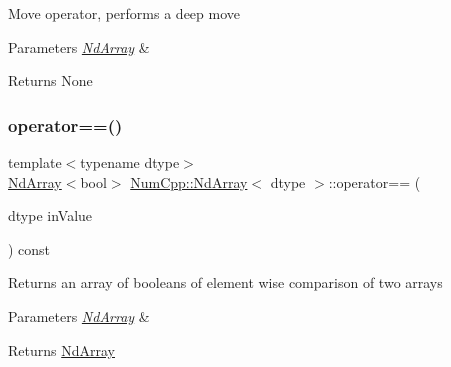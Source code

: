 Move operator, performs a deep move


\begin{DoxyParams}{Parameters}
{\em \mbox{\hyperlink{class_num_cpp_1_1_nd_array}{Nd\+Array}}} & \\
\hline
\end{DoxyParams}
\begin{DoxyReturn}{Returns}
None 
\end{DoxyReturn}
\mbox{\label{class_num_cpp_1_1_nd_array_ac14230e3c4a47152025ff97e9d78cc78}} 
\subsubsection{\texorpdfstring{operator==()}{operator==()}\hspace{0.1cm}{\footnotesize\ttfamily [1/2]}}
{\footnotesize\ttfamily template$<$typename dtype$>$ \\
\mbox{\hyperlink{class_num_cpp_1_1_nd_array}{Nd\+Array}}$<$bool$>$ \mbox{\hyperlink{class_num_cpp_1_1_nd_array}{Num\+Cpp\+::\+Nd\+Array}}$<$ dtype $>$\+::operator== (\begin{DoxyParamCaption}\item[{dtype}]{in\+Value }\end{DoxyParamCaption}) const\hspace{0.3cm}{\ttfamily [inline]}}

Returns an array of booleans of element wise comparison of two arrays


\begin{DoxyParams}{Parameters}
{\em \mbox{\hyperlink{class_num_cpp_1_1_nd_array}{Nd\+Array}}} & \\
\hline
\end{DoxyParams}
\begin{DoxyReturn}{Returns}
\mbox{\hyperlink{class_num_cpp_1_1_nd_array}{Nd\+Array}} 
\end{DoxyReturn}
\mbox{\label{class_num_cpp_1_1_nd_array_ac5950eb2aae170ad83768f7840e90887}} 
